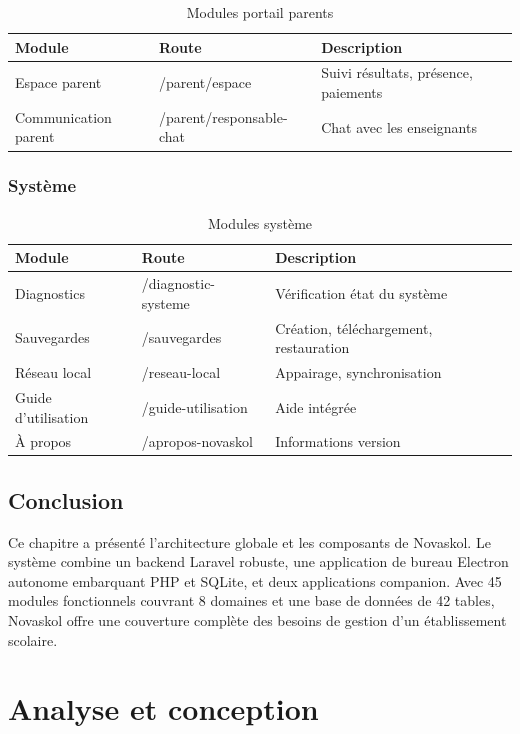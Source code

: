 \documentclass[12pt,a4paper,twoside]{report}
\begin{document}
\begin{table}[h]
\centering
\caption{Modules portail parents}
\begin{tabular}{lll}
\toprule
Module & Route & Description \\
\midrule
Espace parent & /parent/espace & Suivi résultats, présence, paiements \\
Communication parent & /parent/responsable-chat & Chat avec les enseignants \\
\bottomrule
\end{tabular}
\end{table}

\subsection{Système}

\begin{table}[h]
\centering
\caption{Modules système}
\begin{tabular}{lll}
\toprule
Module & Route & Description \\
\midrule
Diagnostics & /diagnostic-systeme & Vérification état du système \\
Sauvegardes & /sauvegardes & Création, téléchargement, restauration \\
Réseau local & /reseau-local & Appairage, synchronisation \\
Guide d'utilisation & /guide-utilisation & Aide intégrée \\
À propos & /apropos-novaskol & Informations version \\
\bottomrule
\end{tabular}
\end{table}

\section{Conclusion}

Ce chapitre a présenté l'architecture globale et les composants de Novaskol. Le système combine un backend Laravel robuste, une application de bureau Electron autonome embarquant PHP et SQLite, et deux applications companion. Avec 45 modules fonctionnels couvrant 8 domaines et une base de données de 42 tables, Novaskol offre une couverture complète des besoins de gestion d'un établissement scolaire.

\chapter{Analyse et conception}
\end{document}
